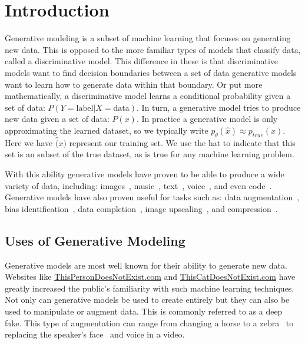 \section{Introduction}
Generative modeling is a subset of machine learning that focuses on generating
new data. This is opposed to the more familiar types of models that classify
data, called a discriminative model. This difference in these is that
discriminative models want to find decision boundaries between a set of data
generative models want to learn how to generate data within that boundary. Or
put more mathematically, a discriminative model learns a conditional probability
given a set of data:  $P(Y=\text{label} | X=\text{data})$.
In turn, a generative model tries to produce new data given a set of data:
$P(x)$. In practice a generative model is only approximating the learned
dataset, so we typically write $p_\theta(\hat{x}) \approx p_{true}(x)$. Here we
have $\hat(x)$ represent our training set. We use the hat to indicate that this
set is an subset of the true dataset, as is true for any machine learning
problem. 

With this ability generative models have proven to be able to produce a wide
variety of data, including:
images~\cite{NIPS2014_5ca3e9b1,DBLP:journals/corr/abs-1812-04948},
music~\cite{DBLP:journals/corr/abs-1709-01620}, text~\cite{DBLP:journals/corr/abs-1810-04805,brown2020language},
voice~\cite{DBLP:journals/corr/abs-1908-07656}, and even
code~\cite{svyatkovskiy2020intellicode}. Generative models have also proven
useful
for tasks such as: data
augmentation~\cite{NIPS2019_9426,DBLP:journals/corr/abs-1909-12220}, bias
identification~\cite{tan2020equalization}, data
completion~\cite{chen2020generative}, image
upscaling~\cite{DBLP:journals/corr/LedigTHCATTWS16}, and
compression~\cite{rippel2017realtime}.

\subsection{Uses of Generative Modeling}
Generative models are most well known for their ability to generate new data.
Websites like \url{ThisPersonDoesNotExist.com} and \url{ThisCatDoesNotExist.com}
have greatly increased the public's familiarity with such machine
learning techniques. Not only can generative models be used to create entirely
but they can also be used to manipulate or augment data. This is commonly
referred to as a deep fake. This type of augmentation can range from changing
a horse to a zebra~\cite{DBLP:journals/corr/ZhuPIE17} to replacing the
speaker's face~\cite{DBLP:journals/corr/abs-2001-00179} and
voice in a video. 

